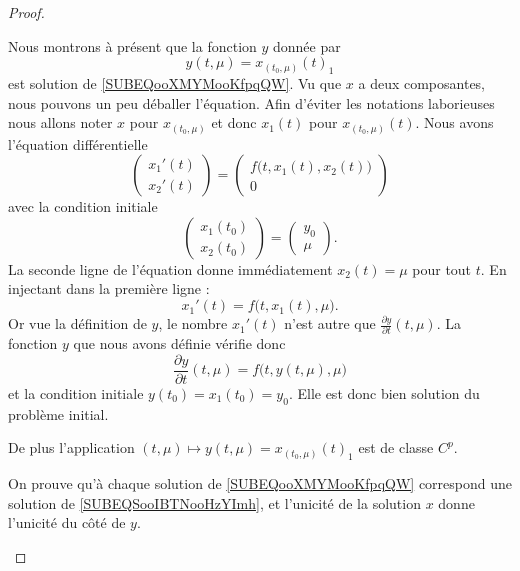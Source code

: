 \begin{proof}
\begin{subproof}
		Nous montrons à présent que la fonction \( y\) donnée par
		\begin{equation}
			y(t,\mu)=x_{(t_0,\mu)}(t)_1
		\end{equation}
		est solution de \eqref{SUBEQooXMYMooKfpqQW}. Vu que \( x\) a deux composantes, nous pouvons un peu déballer l'équation. Afin d'éviter les notations laborieuses nous allons noter \( x\) pour \( x_{(t_0,\mu)}\) et donc \( x_1(t)\) pour \( x_{(t_0,\mu)}(t)\). Nous avons l'équation différentielle
		\begin{equation}
			\begin{pmatrix}
				x_1'(t) \\
				x_2'(t)
			\end{pmatrix}=\begin{pmatrix}
				f\big( t,x_1(t),x_2(t) \big) \\
				0
			\end{pmatrix}
		\end{equation}
		avec la condition initiale
		\begin{equation}
			\begin{pmatrix}
				x_1(t_0) \\
				x_2(t_0)
			\end{pmatrix}=\begin{pmatrix}
				y_0 \\
				\mu
			\end{pmatrix}.
		\end{equation}
		La seconde ligne de l'équation donne immédiatement \( x_2(t)=\mu\) pour tout \( t\). En injectant dans la première ligne :
		\begin{equation}
			x_1'(t)=f\big( t,x_1(t),\mu \big).
		\end{equation}
		Or vue la définition de \( y\), le nombre \( x_1'(t)\) n'est autre que \( \frac{ \partial y }{ \partial t }(t,\mu)\). La fonction \( y\) que nous avons définie vérifie donc
		\begin{equation}
			\frac{ \partial y }{ \partial t }(t,\mu)=f\big( t,y(t,\mu),\mu \big)
		\end{equation}
		et la condition initiale \( y(t_0)=x_1(t_0)=y_0\). Elle est donc bien solution du problème initial.

		De plus l'application \( (t,\mu)\mapsto y(t,\mu)=x_{(t_0,\mu)}(t)_1\) est de classe \( C^p\).

		\spitem[Unicité]
		On prouve qu'à chaque solution de \eqref{SUBEQooXMYMooKfpqQW} correspond une solution de \eqref{SUBEQSooIBTNooHzYImh}, et l'unicité de la solution \( x\) donne l'unicité du côté de \( y\).
	\end{subproof}
\end{proof}


